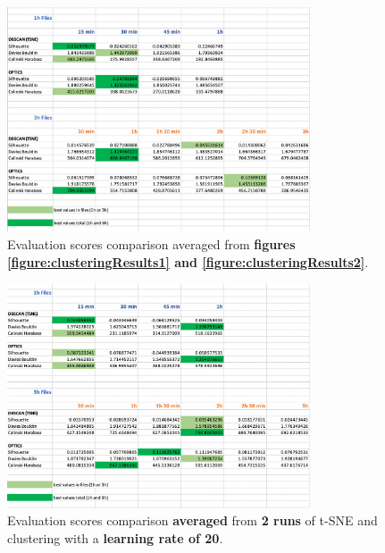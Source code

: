 \begin{figure}[H]
  \centering
  \includegraphics[width=0.8\textwidth]{./images/clusteringResults/clusteringResults3.png}
  \caption{Evaluation scores comparison averaged from \textbf{figures \ref{figure:clusteringResults1} and \ref{figure:clusteringResults2}}.}
  \label{figure:clusteringResults3}
\end{figure}

\begin{figure}[H]
  \centering
  \includegraphics[width=0.8\textwidth]{./images/clusteringResults/clusteringResults4.png}
  \caption{Evaluation scores comparison \textbf{averaged} from \textbf{2 runs} of t-SNE and clustering with a \textbf{learning rate of 20}.}
  \label{figure:clusteringResults4}
\end{figure}

